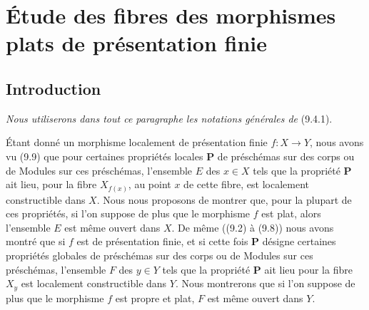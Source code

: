 \section{Étude des fibres des morphismes plats de présentation finie}
\label{section:IV.12-fr}

\setcounter{subsection}{-1}
\subsection{Introduction}
\label{subsection:IV.12.0-fr}

\emph{Nous utiliserons dans tout ce paragraphe les notations générales de}
(9.4.1).

\begin{env}[12.0.1]
\label{IV.12.0.1-fr}
Étant donné un morphisme localement de présentation finie $f:X\to Y$, nous
avons vu (9.9) que pour certaines propriétés locales $\mathbf P$ de préschémas
sur des corps ou de Modules sur ces préschémas, l'ensemble $E$ des $x\in X$
tels que la propriété $\mathbf P$ ait lieu, pour la fibre $X_{f(x)}$, au point
$x$ de cette fibre, est localement constructible dans $X$. Nous nous proposons
de montrer que, pour la plupart de ces propriétés, si l'on suppose de plus que
le morphisme $f$ est plat, alors l'ensemble $E$ est même ouvert dans $X$. De
même ((9.2) à (9.8)) nous avons montré que si $f$ est de présentation finie,
et si cette fois $\mathbf P$ désigne certaines propriétés globales de
préschémas sur des corps ou de Modules sur ces préschémas, l'ensemble $F$ des
$y\in Y$ tels que la propriété $\mathbf P$ ait lieu pour la fibre $X_y$ est
localement constructible dans $Y$. Nous montrerons que si l'on suppose de plus
que le morphisme $f$ est propre et plat, $F$ est même ouvert dans $Y$.
\end{env}

